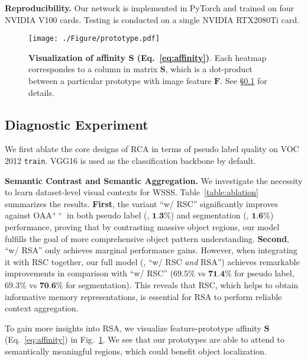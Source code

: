 \documentclass[10pt,twocolumn,letterpaper]{article}
\begin{document}
\noindent\textbf{Reproducibility.} Our network is implemented in PyTorch and trained on four \mbox{NVIDIA} V100 cards. Testing is conducted on a single \mbox{NVIDIA} \mbox{RTX2080Ti} card. 




\begin{figure}[t]
	\centering
	\texttt{[image: ./Figure/prototype.pdf]}
	\vspace{-18pt}
	\captionsetup{font=small}
	\caption{\small \textbf{Visualization of affinity $\bm{S}$ (Eq.~\ref{eq:affinity})}. Each heatmap correspondes to a column in matrix $\bm{S}$, which is a dot-product between  a particular prototype with image feature $\bm{F}$. See \S\ref{sec:ablation} for details.}
	\label{fig:affinity}
	\vspace{-5pt}
\end{figure}

\subsection{Diagnostic Experiment}\label{sec:ablation}

We first ablate the core designs of RCA in terms of pseudo label quality on  {VOC} 2012 \texttt{train}. \mbox{VGG16} is used as the classification backbone by default.

\noindent\textbf{Semantic Contrast and Semantic Aggregation.} We  investigate the necessity to learn dataset-level visual contexts for WSSS. Table~\ref{table:ablation} summarizes the results. \textbf{First}, the variant ``{w/} RSC'' significantly improves against OAA$^{++}$ in both pseudo label (\ie, $\textbf{1.3\%}$) and segmentation (\ie, $\textbf{1.6\%}$) performance, proving that by contrasting massive object regions, our model fulfills the goal of  more comprehensive object pattern understanding. \textbf{Second}, ``{w/} RSA'' only achieves marginal  performance gains. However, when integrating it with RSC together, our full model (\ie, ``{w/} RSC \textit{and} RSA'') achieves remarkable improvements in comparison with ``{w/} RSC'' ($69.5\%$ vs $\textbf{71.4\%}$ for pseudo label, $69.3\%$ vs $\textbf{70.6\%}$ for segmentation). This reveals that RSC, which helps to obtain informative memory representations, is essential for RSA to perform  reliable context aggregation.

To gain more insights into RSA, we visualize feature-prototype affinity $\bm{S}$ (Eq.~\ref{eq:affinity}) in Fig.~\ref{fig:affinity}. We see that our prototypes are able to attend to semantically meaningful regions, which could benefit object localization.
\end{document}
